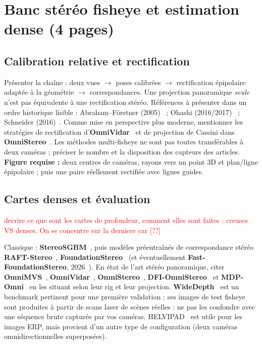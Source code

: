 \documentclass[11pt,a4paper]{article}
\begin{document}
\section{Banc stéréo fisheye et estimation dense (4 pages)}
\subsection*{Calibration relative et rectification}
\noindent Présenter la chaîne : deux vues $\to$ poses calibrées $\to$ rectification épipolaire adaptée à la géométrie $\to$ correspondances. Une projection panoramique \emph{seule} n'est pas équivalente à une rectification stéréo. Références à présenter dans un ordre historique lisible : Abraham--Förstner (2005)~\cite{abraham2005} ; Ohashi (2016/2017)~\cite{ohashi2016,ohashi2017} ; Schneider (2016)~\cite{schneider2016}. Comme mise en perspective plus moderne, mentionner les stratégies de rectification d'\textbf{OmniVidar}~\cite{xie2023} et de projection de Cassini dans \textbf{OmniStereo}~\cite{deng2025}. Les méthodes multi-fisheye ne sont pas toutes transférables à deux caméras ; préciser le nombre et la disposition des capteurs des articles.
\noindent \textbf{Figure requise :} deux centres de caméras, rayons vers un point 3D et plan/ligne épipolaire ; puis une paire réellement rectifiée avec lignes guides.



\subsection*{Cartes denses et évaluation}
\textcolor{red}{decrire ce que sont les cartes de profondeur, comment elles sont faites : creuses VS denses. On se concentre sur la derniere car [??]}

Classique : \textbf{StereoSGBM}~\cite{hirschmuller2008}, puis modèles préentraînés de correspondance stéréo \textbf{RAFT-Stereo}~\cite{lipson2021}, \textbf{FoundationStereo}~\cite{wen2025} (et éventuellement \textbf{Fast-FoundationStereo}, 2026~\cite{wen2026fast}). En état de l'art stéréo panoramique, citer \textbf{OmniMVS}~\cite{won2019}, \textbf{OmniVidar}~\cite{xie2023}, \textbf{OmniStereo}~\cite{deng2025}, \textbf{DFI-OmniStereo}~\cite{endres2025} et \textbf{MDP-Omni}~\cite{son2025} en les situant selon leur rig et leur projection. \textbf{WideDepth}~\cite{indyk2026} est un benchmark pertinent pour une première validation ; ses images de test fisheye sont produites à partir de scans laser de scènes réelles : ne pas les confondre avec une séquence brute capturée par vos caméras. HELVIPAD~\cite{zayene2025} est utile pour les images ERP, mais provient d'un autre type de configuration (deux caméras omnidirectionnelles superposées).
\end{document}

